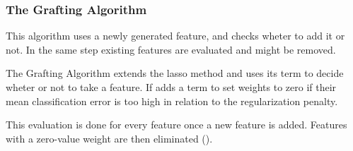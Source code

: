 \subsubsection{The Grafting Algorithm}
\label{sec:methods.streaming.grafting}


This algorithm uses a newly generated feature, and checks wheter to add it or
not. In the same step existing features are evaluated and might be removed.

The Grafting Algorithm extends the lasso method and uses its term to decide
wheter or not to take a feature. If adds a term to set weights to zero if their
mean classification error is too high in relation to the regularization penalty.

This evaluation is done for every feature once a new feature is added.
Features with a zero-value weight are then eliminated
(\cite{perkins2003online}).
